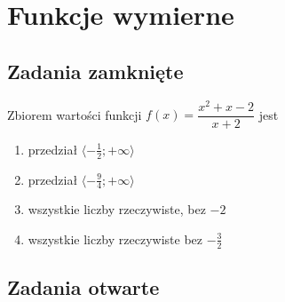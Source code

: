 \setcounter{parc}{0}
\addtocounter{chapc}{1}

\chapter{Funkcje wymierne}

\section{Zadania zamknięte}

\zadanie Zbiorem wartości funkcji $f(x) = \dfrac{x^2 + x - 2}{x + 2}$ jest
\begin{enumerate}[label=\alph*)]
	\item przedział $ \langle -\frac{1}{2}; +\infty \rangle $
	\item przedział $ \langle -\frac{9}{4}; +\infty \rangle $
	\item wszystkie liczby rzeczywiste, bez $-2$ %
	\item wszystkie liczby rzeczywiste bez $-\frac{3}{2}$
\end{enumerate}

\section{Zadania otwarte}


